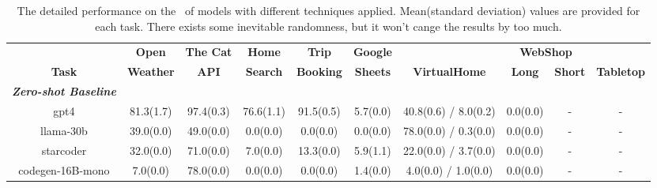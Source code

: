 \begin{table}[]
\caption{The detailed performance on the \snact~of models with different techniques applied. Mean(standard deviation) values are provided for each task. There exists some inevitable randomness, but it won't cange the results by too much.}
\label{tab:baselines_over_techniques}
\begin{adjustbox}{max width=\textwidth}
\setlength{\tabcolsep}{2pt}
\begin{tabular}{@{}cccccccccc@{}}
\toprule
                                          & \textbf{Open}                           & \textbf{The Cat}                    & \textbf{Home}        & \textbf{Trip}        & \textbf{Google}      &                                        & \multicolumn{2}{c}{\textbf{WebShop}}        &                                     \\
\multirow{-2}{*}{\textbf{Task}}           & {\color[HTML]{1F1F1F} \textbf{Weather}} & {\color[HTML]{1F1F1F} \textbf{API}} & \textbf{Search}      & \textbf{Booking}     & \textbf{Sheets}      & \multirow{-2}{*}{\textbf{VirtualHome}} & \textbf{Long}        & \textbf{Short}       & \multirow{-2}{*}{\textbf{Tabletop}} \\
\midrule
\textit{\textbf{Zero-shot Baseline}}          & \multicolumn{1}{l}{} & \multicolumn{1}{l}{} & \multicolumn{1}{l}{} & \multicolumn{1}{l}{} & \multicolumn{1}{l}{} & \multicolumn{1}{l}{}  & \multicolumn{1}{l}{} & \multicolumn{1}{l}{} & \multicolumn{1}{l}{} \\
gpt4                                          & 81.3(1.7)            & 97.4(0.3)            & 76.6(1.1)            & 91.5(0.5)            & 5.7(0.0)             & 40.8(0.6) / 8.0(0.2)  & 0.0(0.0)             & -                    & -                    \\
llama-30b                                     & 39.0(0.0)            & 49.0(0.0)            & 0.0(0.0)             & 0.0(0.0)             & 0.0(0.0)             & 78.0(0.0) / 0.3(0.0)  & 0.0(0.0)             & -                    & -                    \\
starcoder                                     & 32.0(0.0)            & 71.0(0.0)            & 7.0(0.0)             & 13.3(0.0)            & 5.9(1.1)             & 22.0(0.0) / 3.7(0.0)  & 0.0(0.0)             & -                    & -                    \\
codegen-16B-mono                              & 7.0(0.0)             & 78.0(0.0)            & 0.0(0.0)             & 0.0(0.0)             & 1.4(0.0)             & 4.0(0.0) / 1.0(0.0)   & 0.0(0.0)             & -                    & -                    \\

\end{tabular}
\end{adjustbox}
\end{table}
